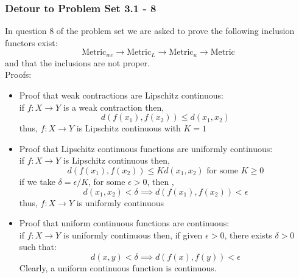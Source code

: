 \begin{frame}
    \frametitle{Detour to Problem Set 3.1 - 8}
    In question 8 of the problem set we are asked to prove the following inclusion functors exist:
    \begin{equation*}
        \text{Metric}_{wc} \rightarrow \text{Metric}_L \rightarrow \text{Metric}_u \rightarrow \text{Metric}
    \end{equation*}
    and that the inclusions are not proper.\\

    \pause
    Proofs:
    \begin{itemize}
        \item Proof that weak contractions are Lipschitz continuous:\\
            if \(f:X\rightarrow Y\) is a weak contraction then, 
            \begin{equation*}
                d(f(x_1),f(x_2))\leq d(x_1,x_2)
            \end{equation*}
            thus, \(f:X\rightarrow Y\) is Lipschitz continuous with \(K=1\)
    \end{itemize}
\end{frame}

\begin{frame}
    \begin{itemize}
        \item Proof that Lipschitz continuous functions are uniformly continuous:\\
            if \(f:X\rightarrow Y\) is Lipschitz continuous then,
            \begin{equation*}
                d(f(x_1),f(x_2))\leq Kd(x_1,x_2)\text{ for some }K\geq 0
            \end{equation*}
            if we take \(\delta = \epsilon/K\), for some \(\epsilon>0\), then , 
            \begin{equation*}
                d(x_1,x_2)<\delta \implies d(f(x_1),f(x_2))<\epsilon
            \end{equation*}
            thus, \(f:X\rightarrow Y \) is uniformly continuous
        \pause
        \item Proof that uniform continuous functions are continuous:\\
            if \(f:X\rightarrow Y\) is uniformly continuous then, if given \(\epsilon > 0\), there exists \(\delta>0\) such that:
            \begin{equation*}
                d(x,y)<\delta \implies d(f(x),f(y))<\epsilon
            \end{equation*}
            Clearly, a uniform continuous function is continuous.
    \end{itemize}
\end{frame}

